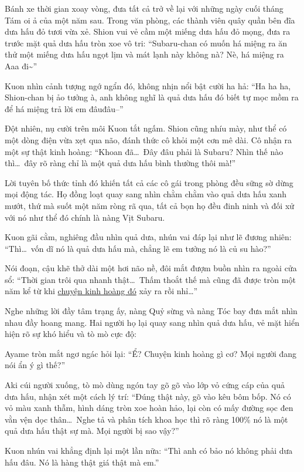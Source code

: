 \documentclass[../main.tex]{subfiles}
\begin{document}
Bánh xe thời gian xoay vòng, đưa tất cả trở về lại với những ngày cuối tháng Tám oi ả của một năm sau. Trong văn phòng, các thành viên quây quần bên đĩa dưa hấu đỏ tươi vừa xẻ. Shion vui vẻ cầm một miếng dưa hấu đỏ mọng, đưa ra trước mặt quả dưa hấu tròn xoe vô tri:
``Subaru-chan có muốn há miệng ra ăn thử một miếng dưa hấu ngọt lịm và mát lạnh này không nà? Nè, há miệng ra Aaa đi\~{}''

Kuon nhìn cảnh tượng ngớ ngẩn đó, không nhịn nổi bật cười ha hả:
``Ha ha ha, Shion-chan bị ảo tưởng à, anh không nghĩ là quả dưa hấu đó biết tự mọc mồm ra để há miệng trả lời em đâuđâu--''

Đột nhiên, nụ cười trên môi Kuon tắt ngấm. Shion cũng nhíu mày, như thể có một dòng điện vừa xẹt qua não, đánh thức cô khỏi một cơn mê dài. Cô nhận ra một sự thật kinh hoàng:
``Khoan đã\dots\ Đây đâu phải là Subaru? Nhìn thế nào thì\dots\ đây rõ ràng chỉ là một quả dưa hấu bình thường thôi mà!''

Lời tuyên bố thức tỉnh đó khiến tất cả các cô gái trong phòng đều sững sờ dừng mọi động tác. Họ đồng loạt quay sang nhìn chằm chằm vào quả dưa hấu xanh mướt, thứ mà suốt một năm ròng rã qua, tất cả bọn họ đều đinh ninh và đối xử với nó như thể đó chính là nàng Vịt Subaru.

Kuon gãi cằm, nghiêng đầu nhìn quả dưa, nhún vai đáp lại như lẽ đương nhiên:
``Thì\dots\ vốn dĩ nó là quả dưa hấu mà, chẳng lẽ em tưởng nó là củ su hào?''

Nói đoạn, cậu khẽ thở dài một hơi não nề, đôi mắt đượm buồn nhìn ra ngoài cửa sổ:
``Thời gian trôi qua nhanh thật\dots\ Thấm thoắt thế mà cũng đã được tròn một năm kể từ khi \uline{chuyện kinh hoàng đó} xảy ra rồi nhỉ\dots''

Nghe những lời đầy tâm trạng ấy, nàng Quỷ sừng và nàng Tóc bay đưa mắt nhìn nhau đầy hoang mang. Hai người họ lại quay sang nhìn quả dưa hấu, vẻ mặt hiển hiện rõ sự khó hiểu và tò mò cực độ:

Ayame tròn mắt ngơ ngác hỏi lại:
``Ể? Chuyện kinh hoàng gì cơ? Mọi người đang nói ẩn ý gì thế?''

Aki cúi người xuống, tò mò dùng ngón tay gõ gõ vào lớp vỏ cứng cáp của quả dưa hấu, nhận xét một cách lý trí:
``Đúng thật này, gõ vào kêu bôm bốp. Nó có vỏ màu xanh thẫm, hình dáng tròn xoe hoàn hảo, lại còn có mấy đường sọc đen vằn vện dọc thân\dots\ Nghe tả và phân tích khoa học thì rõ ràng 100\% nó là một quả dưa hấu thật sự mà. Mọi người bị sao vậy?''

Kuon nhún vai khẳng định lại một lần nữa:
``Thì anh có bảo nó không phải dưa hấu đâu. Nó là hàng thật giá thật mà em.''
\end{document}
